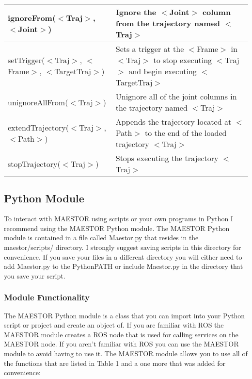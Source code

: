 \documentclass[12pt]{article}
\begin{document}
\begin{center}
\begin{tabular}{| l | p{8cm}|}
		ignoreFrom($<$Traj$>$, $<$Joint$>$) 
		& Ignore the $<$Joint$>$ column from the trajectory named $<$Traj$>$  \\ \hline
		
		setTrigger($<$Traj$>$, $<$Frame$>$, $<$TargetTraj$>$)
		& Sets a trigger at the $<$Frame$>$ in $<$Traj$>$ to stop executing $<$Traj$>$ and begin executing $<$TargetTraj$>$  \\ \hline
		
		unignoreAllFrom($<$Traj$>$)
		& Unignore all of the joint columns in the trajectory named $<$Traj$>$   \\ \hline
		
		extendTrajectory($<$Traj$>$, $<$Path$>$)
		& Appends the trajectory located at $<$Path$>$ to the end of the loaded trajectory $<$Traj$>$  \\ \hline
		
		stopTrajectory($<$Traj$>$)
		& Stops executing the trajectory $<$Traj$>$  \\ \hline
	
	\end{tabular}
\end{center}
\pagebreak

\subsection{Python Module}

To interact with MAESTOR using scripts or your own programs in Python I recommend using the MAESTOR Python module. The MAESTOR Python module is contained in a file called Maestor.py that resides in the maestor/scripts/ directory. I strongly suggest saving scripts in this directory for convenience. If you save your files in a different directory you will either need to add Maestor.py to the PythonPATH or include Maestor.py in the directory that you save your script. 

\subsubsection{Module Functionality}

The MAESTOR Python module is a class that you can import into your Python script or project and create an object of. If you are familiar with ROS the  MAESTOR module creates a ROS node that is used for calling services on the MAESTOR node. If you aren't familiar with ROS you can use the MAESTOR module to avoid having to use it. The MAESTOR module allows you to use all of the functions that are listed in Table 1 and a one more that was added for convenience: 
\end{document}
